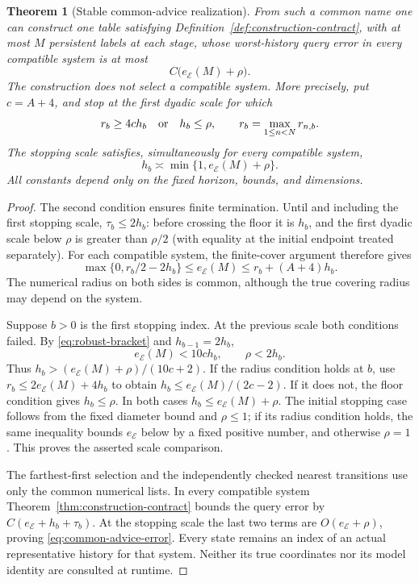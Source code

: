 \documentclass[11pt]{amsart}
\newtheorem{theorem}{Theorem}[section]
\theoremstyle{definition}\newtheorem{definition}[theorem]{Definition}
\theoremstyle{remark}\newtheorem{remark}[theorem]{Remark}
\begin{document}
\begin{theorem}[Stable common-advice realization]\label{thm:common-advice}
From such a common name one can construct one table satisfying
Definition~\ref{def:construction-contract}, with at most $M$ persistent
labels at each stage, whose worst-history query error in every compatible
system is at most
\begin{equation}\label{eq:common-advice-error}
 C\bigl(e_{\mathcal E}(M)+\rho\bigr).
\end{equation}
The construction does not select a compatible system. More precisely,
put $c=A+4$, and stop at the first dyadic scale for which
\begin{equation}\label{eq:robust-stop}
 r_b\ge4c h_b\quad\hbox{or}\quad h_b\le\rho,
 \qquad r_b=\max_{1\le n<N}r_{n,b}.
\end{equation}
The stopping scale satisfies, simultaneously for every compatible system,
\[
 h_b\asymp\min\{1,e_{\mathcal E}(M)+\rho\}.
\]
All constants depend only on the fixed horizon, bounds, and dimensions.
\end{theorem}
\begin{proof}
The second condition ensures finite termination. Until and including the
first stopping scale, $\tau_b\le2h_b$: before crossing the floor it
is $h_b$, and the first dyadic scale below $\rho$ is greater than
$\rho/2$ (with equality at the initial endpoint treated separately).
For each compatible system, the finite-cover argument therefore gives
\begin{equation}\label{eq:robust-bracket}
 \max\{0,r_b/2-2h_b\}\le e_{\mathcal E}(M)
           \le r_b+(A+4)h_b.
\end{equation}
The numerical radius on both sides is common, although the true covering
radius may depend on the system.

Suppose $b>0$ is the first stopping index. At the previous scale both
conditions failed. By \eqref{eq:robust-bracket} and
$h_{b-1}=2h_b$,
\[
 e_{\mathcal E}(M)<10c h_b,\qquad \rho<2h_b.
\]
Thus $h_b>(e_{\mathcal E}(M)+\rho)/(10c+2)$.
If the radius condition holds at $b$, use
$r_b\le2e_{\mathcal E}(M)+4h_b$ to obtain
$h_b\le e_{\mathcal E}(M)/(2c-2)$.
If it does not, the floor condition gives $h_b\le\rho$.
In both cases $h_b\le e_{\mathcal E}(M)+\rho$.
The initial stopping case follows from the fixed diameter bound and
$\rho\le1$; if its radius condition holds, the same inequality bounds
$e_{\mathcal E}$ below by a fixed positive number, and otherwise
$\rho=1$. This proves the asserted scale comparison.

The farthest-first selection and the independently checked nearest
transitions use only the common numerical lists. In every compatible
system Theorem~\ref{thm:construction-contract} bounds the query error
by $C(e_{\mathcal E}+h_b+\tau_b)$. At the stopping scale the last
two terms are $O(e_{\mathcal E}+\rho)$, proving
\eqref{eq:common-advice-error}. Every state remains an index of an
actual representative history for that system. Neither its true
coordinates nor its model identity are consulted at runtime.
\end{proof}
\end{document}
